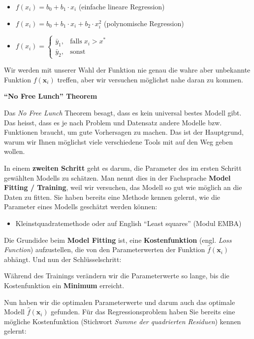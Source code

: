 \documentclass[
]{book}
\providecommand{\tightlist}{%
  \setlength{\itemsep}{0pt}\setlength{\parskip}{0pt}}
\begin{document}
\begin{itemize}
\tightlist
\item
  \(f(x_i) = b_0 + b_1 \cdot x_i\) (einfache lineare Regression)
\item
  \(f(x_i) = b_0 + b_1 \cdot x_i + b_2 \cdot x_i^2\) (polynomische Regression)
\item
  \(f(x_i) = \begin{cases} \bar{y}_1, & \text{falls}\; x_i > x^*\\ \bar{y}_2, & \text{sonst} \end{cases}\)
\end{itemize}

Wir werden mit unserer Wahl der Funktion nie genau die wahre aber unbekannte Funktion \(f(\mathbf{x}_i)\) treffen, aber wir versuchen möglichst nahe daran zu kommen.

\textbf{``No Free Lunch'' Theorem}

Das \emph{No Free Lunch} Theorem besagt, dass es kein universal bestes Modell gibt. Das heisst, dass es je nach Problem und Datensatz andere Modelle bzw. Funktionen braucht, um gute Vorhersagen zu machen. Das ist der Hauptgrund, warum wir Ihnen möglichst viele verschiedene Tools mit auf den Weg geben wollen.

In einem \textbf{zweiten Schritt} geht es darum, die Parameter des im ersten Schritt gewählten Modells zu schätzen. Man nennt dies in der Fachsprache \textbf{Model Fitting / Training}, weil wir versuchen, das Modell so gut wie möglich an die Daten zu fitten. Sie haben bereits eine Methode kennen gelernt, wie die Parameter eines Modells geschätzt werden können:

\begin{itemize}
\tightlist
\item
  Kleinstquadratemethode oder auf English ``Least squares'' (Modul EMBA)
\end{itemize}

Die Grundidee beim \textbf{Model Fitting} ist, eine \textbf{Kostenfunktion} (engl. \emph{Loss Function}) aufzustellen, die von den Parameterwerten der Funktion \(\hat{f}(\mathbf{x}_i)\) abhängt. Und nun der Schlüsselschritt:

Während des Trainings verändern wir die Parameterwerte so lange, bis die Kostenfunktion ein \textbf{Minimum} erreicht.

Nun haben wir die optimalen Parameterwerte und darum auch das optimale Modell \(\hat{f}(\mathbf{x}_i)\) gefunden. Für das Regressionsproblem haben Sie bereits eine mögliche Kostenfunktion (Stichwort \emph{Summe der quadrierten Residuen}) kennen gelernt:
\end{document}
